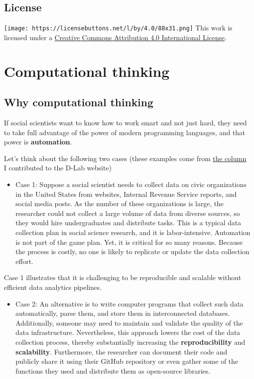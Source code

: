 \documentclass[
]{book}
\providecommand{\tightlist}{%
  \setlength{\itemsep}{0pt}\setlength{\parskip}{0pt}}
\begin{document}
\hypertarget{license}{%
\section{License}\label{license}}

\texttt{[image: https://licensebuttons.net/l/by/4.0/88x31.png]} This work is licensed under a \href{https://creativecommons.org/licenses/by/4.0/}{Creative Commons Attribution 4.0 International License}.

\hypertarget{motivation}{%
\chapter{Computational thinking}\label{motivation}}

\hypertarget{why-computational-thinking}{%
\section{Why computational thinking}\label{why-computational-thinking}}

If social scientists want to know how to work smart and not just hard, they need to take full advantage of the power of modern programming languages, and that power is \textbf{automation}.

Let's think about the following two cases (these examples come from \href{https://dlab.berkeley.edu/blog/why-teaching-social-scientists-how-code-professional-important}{the column} I contributed to the D-Lab website)

\begin{itemize}
\tightlist
\item
  Case 1: Suppose a social scientist needs to collect data on civic organizations in the United States from websites, Internal Revenue Service reports, and social media posts. As the number of these organizations is large, the researcher could not collect a large volume of data from diverse sources, so they would hire undergraduates and distribute tasks. This is a typical data collection plan in social science research, and it is labor-intensive. Automation is not part of the game plan. Yet, it is critical for so many reasons. Because the process is costly, no one is likely to replicate or update the data collection effort.
\end{itemize}

Case 1 illustrates that it is challenging to be reproducible and scalable without efficient data analytics pipelines.

\begin{itemize}
\tightlist
\item
  Case 2: An alternative is to write computer programs that collect such data automatically, parse them, and store them in interconnected databases. Additionally, someone may need to maintain and validate the quality of the data infrastructure. Nevertheless, this approach lowers the cost of the data collection process, thereby substantially increasing the \textbf{reproducibility} and \textbf{scalability}. Furthermore, the researcher can document their code and publicly share it using their GitHub repository or even gather some of the functions they used and distribute them as open-source libraries.
\end{itemize}
\end{document}
